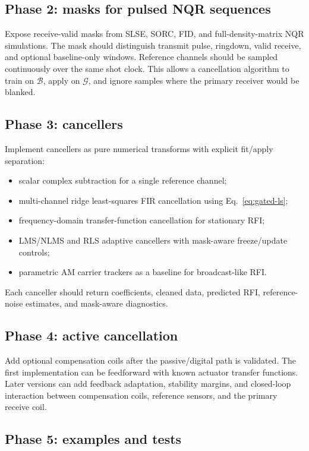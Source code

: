 \documentclass[10pt]{article}
\begin{document}
\subsection{Phase 2: masks for pulsed NQR sequences}

Expose receive-valid masks from SLSE, SORC, FID, and full-density-matrix NQR
simulations.  The mask should distinguish transmit pulse, ringdown, valid
receive, and optional baseline-only windows.  Reference channels should be
sampled continuously over the same shot clock.  This allows a cancellation
algorithm to train on \(\mathcal B\), apply on \(\mathcal G\), and ignore
samples where the primary receiver would be blanked.

\subsection{Phase 3: cancellers}

Implement cancellers as pure numerical transforms with explicit fit/apply
separation:
\begin{itemize}
  \item scalar complex subtraction for a single reference channel;
  \item multi-channel ridge least-squares FIR cancellation using Eq.~\eqref{eq:gated-ls};
  \item frequency-domain transfer-function cancellation for stationary RFI;
  \item LMS/NLMS and RLS adaptive cancellers with mask-aware freeze/update
        controls;
  \item parametric AM carrier trackers as a baseline for broadcast-like RFI.
\end{itemize}
Each canceller should return coefficients, cleaned data, predicted RFI,
reference-noise estimates, and mask-aware diagnostics.

\subsection{Phase 4: active cancellation}

Add optional compensation coils after the passive/digital path is validated.
The first implementation can be feedforward with known actuator transfer
functions.  Later versions can add feedback adaptation, stability margins, and
closed-loop interaction between compensation coils, reference sensors, and the
primary receive coil.

\subsection{Phase 5: examples and tests}
\end{document}
